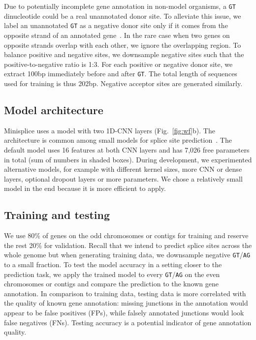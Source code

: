 \documentclass[webpdf,contemporary,large,namedate]{oup-authoring-template}%
\begin{document}
Due to potentially incomplete gene annotation in non-model organisms,
a {\tt GT} dinucleotide could be a real unannotated donor site.
To alleviate this issue, we label an unannotated {\tt GT} as a negative donor site
only if it comes from the opposite strand of an annotated gene~\citep{Chao:2024aa}.
In the rare case when two genes on opposite strands overlap with each other,
we ignore the overlapping region.
To balance positive and negative sites,
we downsample negative sites such that the positive-to-negative ratio is 1:3.
For each positive or negative donor site,
we extract 100bp immediately before and after {\tt GT}.
The total length of sequences used for training is thus 202bp.
Negative acceptor sites are generated similarly.

\subsection{Model architecture}

Minisplice uses a model with two 1D-CNN layers (Fig.~\ref{fig:wf}b).
The architecture is common among small models for splice site prediction~\citep{Zabardast:2023aa}.
The default model uses 16 features at both CNN layers and has 7,026 free parameters in total (sum of numbers in shaded boxes).
During development, we experimented alternative models,
for example with different kernel sizes, more CNN or dense layers, optional dropout layers or more parameters.
We chose a relatively small model in the end because it is more efficient to apply.

\subsection{Training and testing}

We use 80\% of genes on the odd chromosomes or contigs for training and reserve the rest 20\% for validation.
Recall that we intend to predict splice sites across the whole genome
but when generating training data, we downsample negative {\tt GT}/{\tt AG} to a small fraction.
To test the model accuracy in a setting closer to the prediction task,
we apply the trained model to every {\tt GT}/{\tt AG} on the even chromosomes or contigs
and compare the prediction to the known gene annotation.
In comparison to training data, testing data is more correlated with the quality of known gene annotation:
missing junctions in the annotation would appear to be false positives (FPs),
while falsely annotated junctions would look false negatives (FNs).
Testing accuracy is a potential indicator of gene annotation quality.
\end{document}

